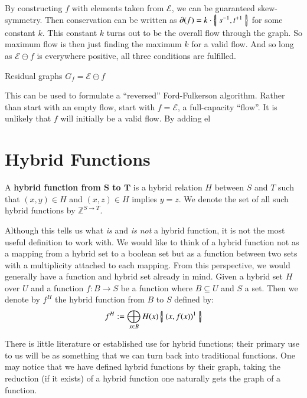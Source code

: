 By constructing $f$ with elements taken from $\mathcal{E}$, we can be guaranteed skew-symmetry.
Then conservation can be written as $\partial(f) = k \cdot \left\{ \! \left| \; s^{-1}, t^{+1} \; \right| \! \right\}$ for some constant $k$.
This constant $k$ turns out to be the overall flow through the graph.
So maximum flow is then just finding the maximum $k$ for a valid flow.
And so long as $\mathcal{E} \ominus f$ is everywhere positive, all three conditions are fulfilled. 

Residual graphs $G_f = \mathcal{E} \ominus f$ 


This can be used to formulate a ``reversed'' Ford-Fulkerson algorithm.
Rather than start with an empty flow, start with $f = \mathcal{E}$, a full-capacity ``flow''.
It is unlikely that $f$ will initially be a valid flow.
By adding el



\section{Hybrid Functions}\label{sec:HybridFunction}
\begin{definition}
	A \textbf{hybrid function from $\boldsymbol{S}$ to $\boldsymbol{T}$} is 
	a hybrid relation $H$ between $S$ and $T$ such that $(x,y) \in H$ and $(x,z) \in H$ implies $y=z$.
	We denote the set of all such hybrid functions by $\mathbb{Z}^{S \to T}$.
\end{definition}


Although this tells us what \emph{is} and \emph{is not} a hybrid function, it is not the most useful definition to work with. 
We would like to think of a hybrid function not as a mapping from a hybrid set to a boolean set but as
a function between two sets with a multiplicity attached to each mapping.
From this perspective, we would generally have a function and hybrid set already in mind.
Given a hybrid set $H$ over $U$ and a function $f:B \to S$ be a function where $B \subseteq U$ and $S$ a set.
Then we denote by $f^H$ the hybrid function from $B$ to $S$ defined by:
\begin{equation}
	\label{hfunc}
	f^H := \bigoplus_{x \in B} H(x) \left\{ \! \left| \;  (x, f(x) )^1  \; \right| \! \right\}
\end{equation}


There is little literature or established use for hybrid functions;
their primary use to us will be as something that we can turn back into traditional functions.
One may notice that we have defined hybrid functions by their graph,
taking the reduction (if it exists) of a hybrid function one naturally gets the graph of a function.


